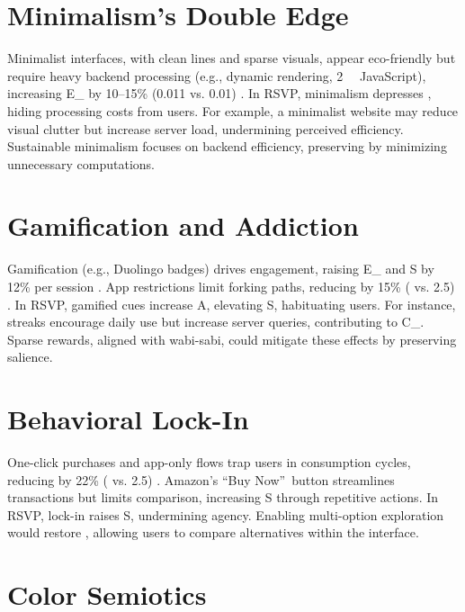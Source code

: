 \documentclass[openany]{book}
\newcommand{\PhiS}{\Phi} %
\newcommand{\Sent}{S} %
\newcommand{\Eint}{E_{\mathrm{int}}} %
\newcommand{\Cfoot}{C_{\mathrm{foot}}} %
\newcommand{\Auton}{\mathcal{A}} %
\newcommand{\kWh}{\mathrm{kWh}}
\begin{document}
\section{Minimalism’s Double Edge}
\label{sec:aesthetic-minimalism}
Minimalist interfaces, with clean lines and sparse visuals, appear eco-friendly but require heavy backend processing (e.g., dynamic rendering, \SI{2}{\mega\byte} JavaScript), increasing \Eint{} by 10--15\% (\SI{0.011}{\kWh} vs. \SI{0.01}{\kWh}) \citep{designlab2024,extentia2024}. In RSVP, minimalism depresses \PhiS{}, hiding processing costs from users. For example, a minimalist website may reduce visual clutter but increase server load, undermining perceived efficiency. Sustainable minimalism focuses on backend efficiency, preserving \PhiS{} by minimizing unnecessary computations.

\section{Gamification and Addiction}
\label{sec:aesthetic-gamification}
Gamification (e.g., Duolingo badges) drives engagement, raising \Eint{} and \Sent{} by 12\% per session \citep{colak2024}. App restrictions limit forking paths, reducing \Auton{} by 15\% (\Auton{}  vs. 2.5) \citep{doctorow2022}. In RSVP, gamified cues increase A, elevating \Sent{}, habituating users. For instance, streaks encourage daily use but increase server queries, contributing to \Cfoot{}. Sparse rewards, aligned with wabi-sabi, could mitigate these effects by preserving salience.

\section{Behavioral Lock-In}
\label{sec:aesthetic-lockin}
One-click purchases and app-only flows trap users in consumption cycles, reducing \Auton{} by 22\% (\Auton{}  vs. 2.5) \citep{doctorow2022}. Amazon’s \textquotedblleft Buy Now\textquotedblright\ button streamlines transactions but limits comparison, increasing \Sent{} through repetitive actions. In RSVP, lock-in raises \Sent{}, undermining agency. Enabling multi-option exploration would restore \Auton{}, allowing users to compare alternatives within the interface.

\section{Color Semiotics}
\label{sec:color-semiotics}
\end{document}
